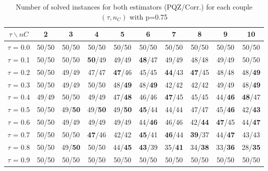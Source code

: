 \begin{table}[H]
\centering

\begin{tabular}{|c|c|c|c|c|c|c|c|c|c|}
\hline
$\tau \backslash nC$ & 2 & 3 & 4 & 5 & 6 & 7 & 8 & 9 & 10 \\
\hline
$\tau$ = 0.0 & 50/50 & 50/50 & 50/50 & 50/50 & 50/50 & 50/50 & 50/50 & 50/50 & 50/50 \\
\hline
$\tau$ = 0.1 & 50/50 & 50/50 & \textbf{50}/49 & 49/49 & \textbf{48}/47 & 49/49 & 48/48 & 49/49 & 50/50 \\
\hline
$\tau$ = 0.2 & 50/50 & 49/49 & 47/47 & \textbf{47}/46 & 45/45 & \textbf{44}/43 & \textbf{47}/45 & 48/48 & 48/\textbf{49} \\
\hline
$\tau$ = 0.3 & 50/50 & 49/49 & 50/50 & 48/\textbf{49} & 48/\textbf{49} & 42/42 & 42/42 & 49/49 & 48/\textbf{49} \\
\hline
$\tau$ = 0.4 & 49/49 & 50/50 & 49/49 & 47/\textbf{48} & 46/46 & \textbf{47}/45 & 45/45 & 44/\textbf{46} & \textbf{48}/47 \\
\hline
$\tau$ = 0.5 & 50/50 & 49/\textbf{50} & 49/\textbf{50} & 49/\textbf{50} & \textbf{45}/44 & 44/44 & 47/47 & 45/\textbf{46} & 42/\textbf{43} \\
\hline
$\tau$ = 0.6 & 50/50 & 49/49 & 49/49 & 49/49 & 44/\textbf{46} & 46/46 & 42/\textbf{44} & \textbf{47}/45 & 44/\textbf{47} \\
\hline
$\tau$ = 0.7 & 50/50 & 50/50 & \textbf{47}/46 & 42/42 & \textbf{45}/41 & \textbf{46}/44 & \textbf{39}/37 & 44/\textbf{47} & 43/43 \\
\hline
$\tau$ = 0.8 & 50/50 & 49/\textbf{50} & 50/50 & 44/\textbf{45} & \textbf{43}/39 & 35/\textbf{41} & 34/\textbf{38} & 33/\textbf{36} & 28/\textbf{35} \\
\hline
$\tau$ = 0.9 & 50/50 & 50/50 & 50/50 & 50/50 & 50/50 & 50/50 & 50/50 & 50/50 & 50/50 \\
\hline
\end{tabular}

~	\caption{Number of solved instances for both estimators (PQZ/Corr.) for each couple $(\tau, n_C)$ with p=0.75}
    \label{nbSolved075}
\end{table}